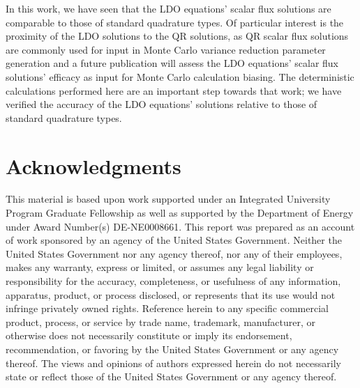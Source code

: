 \documentclass{article} %
\begin{document}
In this work, we have seen that the LDO equations' scalar flux solutions are
comparable to those of standard quadrature types. Of particular interest is
the proximity of the LDO solutions to the QR solutions, as QR scalar flux
solutions are commonly used for input in Monte Carlo variance reduction
parameter generation and a future publication will assess the LDO equations'
scalar flux solutions' efficacy as input for Monte Carlo calculation biasing.
The deterministic calculations performed here are an important step towards
that work; we have verified the accuracy of the LDO equations' solutions
relative to those of standard quadrature types.

\pagebreak
\section*{Acknowledgments}

This material is based upon work supported under an Integrated
University Program Graduate Fellowship as well as supported by the Department 
of Energy under Award Number(s) DE-NE0008661. This report was prepared as an
account of work sponsored by an agency of the United States Government.
Neither the United States Government nor any agency thereof, nor any of their
employees, makes any warranty, express or limited, or assumes any legal
liability or responsibility for the accuracy, completeness, or usefulness of
any information, apparatus, product, or process disclosed, or represents that
its use would not infringe privately owned rights. Reference herein to any 
specific commercial product, process, or service by trade name, trademark, 
manufacturer, or otherwise does not necessarily constitute or imply its 
endorsement, recommendation, or favoring by the United States Government or
any agency thereof. The views and opinions of authors expressed herein do not 
necessarily state or reflect those of the United States Government or any 
agency thereof.

\pagebreak



\end{document}
